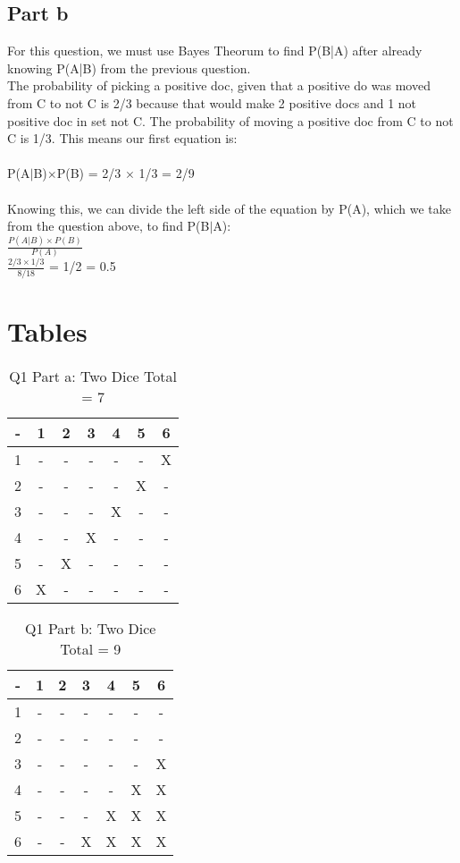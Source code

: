 \documentclass[11pt]{article}
\begin{document}
\subsection*{Part b}
\noindent
For this question, we must use Bayes Theorum to find P(B|A) after already knowing P(A|B) from the previous question.\\
The probability of picking a positive doc, given that a positive do was moved from C to not C is 2/3 because that would make 2 positive docs and 1 not positive doc in set not C. The probability of moving a positive doc from C to not C is 1/3. This means our first equation is:\\\\
P(A$|$B)$ \times $P(B) = 2/3 $ \times$ 1/3 = 2/9\\\\
Knowing this, we can divide the left side of the equation by P(A), which we take from the question above, to find P(B$|$A):\\
$\frac{P(A|B)\times P(B)}{P(A)}$\\
$\frac{2/3\times 1/3}{8/18}$ = 1/2 = 0.5\\

\section*{Tables}

\noindent
\begin{table}[b]
\caption{Q1 Part a: Two Dice Total = 7}
  \begin{tabular}{|c|cccccc|}
  	\hline
    - & 1 & 2 & 3 & 4 & 5 & 6 \\
    \hline
    1 & - & - & - & - & - & X\\
    2 & - & - & - & - & X & -\\
    3 & - & - & - & X & - & -\\
    4 & - & - & X & - & - & -\\
    5 & - & X & - & - & - & -\\
    6 & X & - & - & - & - & -\\
    \hline
  \end{tabular}
\end{table}

\noindent
\begin{table}
\caption{Q1 Part b: Two Dice Total = 9}
  \begin{tabular}{|c|cccccc|}
  	\hline
    - & 1 & 2 & 3 & 4 & 5 & 6 \\
    \hline
    1 & - & - & - & - & - & -\\
    2 & - & - & - & - & - & -\\
    3 & - & - & - & - & - & X\\
    4 & - & - & - & - & X & X\\
    5 & - & - & - & X & X & X\\
    6 & - & - & X & X & X & X\\
    \hline
  \end{tabular}
\end{table}
\end{document}
